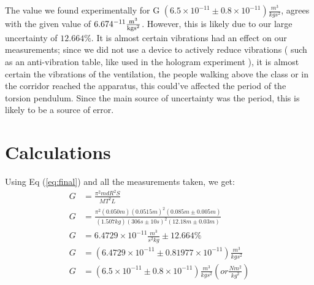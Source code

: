 \documentclass[12pt]{article}
\begin{document}
The value we found experimentally for G $(6.5 \times 10^{-11}\pm 0.8 \times 10^{-11})\frac{\si{m^3}}{\si{kgs^2}}$, agrees with the given value of $6.674 \time 10^{-11}\frac{\si{m^3}}{\si{kgs^2}}$. However, this is likely due to our large uncertainty of $12.664 \%$. It is almost certain vibrations had an effect on our measurements; since we did not use a device to actively reduce vibrations ( such as an anti-vibration table, like used in the hologram experiment ), it is almost certain the vibrations of the ventilation, the people walking above the class or in the corridor reached the apparatus, this could've affected the period of the torsion pendulum. Since the main source of uncertainty was the period, this is likely to be a source of error.

    \section*{Calculations}
    Using Eq (\ref{eq:final}) and all the measurements taken, we get:
    \begin{equation*}
        \begin{aligned}
            G&=\frac{\pi^2mdR^2S}{MT^2L}\\
            G&=\frac{\pi^2(0.050m)(0.0515m)^2(0.085\si{m} \pm 0.005\si{m})}{(1.507kg)(306\si{s} \pm 10\si{s})^2(12.18\si{m} \pm 0.03 \si{m})}\\
            G&=6.4729 \times 10^{-11}\frac{\si{m^3}}{\si{s^2kg}}\pm 12.664\% \\
            G&=(6.4729 \times 10^{-11}\pm 0.81977 \times 10^{-11})\frac{\si{m^3}}{\si{kgs^2}}\\
            G&=(6.5 \times 10^{-11}\pm 0.8 \times 10^{-11})\frac{\si{m^3}}{\si{kgs^2}}( or \frac{\si{Nm^2}}{\si{kg^2}} )\\
        \end{aligned}
    \end{equation*}



   
\end{document}
